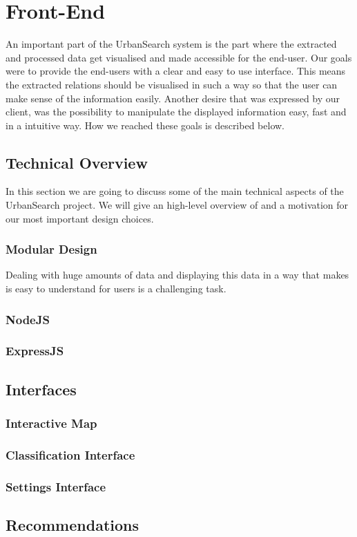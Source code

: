 \section{Front-End}
An important part of the UrbanSearch system is the part where the extracted and processed data get visualised and made accessible for the end-user. Our goals were to provide the end-users with a clear and easy to use interface. This means the extracted relations should be visualised in such a way so that the user can make sense of the information easily. Another desire that was expressed by our client, was the possibility to manipulate the displayed information easy, fast and in a intuitive way. How we reached these goals is described below.

\subsection{Technical Overview}
In this section we are going to discuss some of the main technical aspects of the UrbanSearch project. We will give an high-level overview of and a motivation for our most important design choices.

\subsubsection{Modular Design}
Dealing with huge amounts of data and displaying this data in a way that makes is easy to understand for users is a challenging task. 
\subsubsection{NodeJS}
\subsubsection{ExpressJS}


\subsection{Interfaces}
\subsubsection{Interactive Map}
\subsubsection{Classification Interface}
\subsubsection{Settings Interface}

\subsection{Recommendations}
